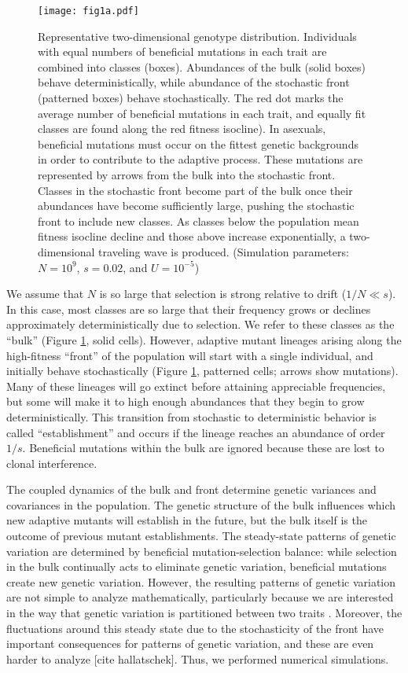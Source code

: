 \documentclass[9pt,twocolumn,twoside]{gsajnl}
\begin{document}
\begin{figure}[!ht]
\texttt{[image: fig1a.pdf]}
\caption{Representative two-dimensional genotype distribution. Individuals with equal numbers of beneficial mutations in each trait are combined into classes (boxes). Abundances of the bulk (solid boxes) behave deterministically, while abundance of the stochastic front (patterned boxes) behave stochastically. The red dot marks the average number of beneficial mutations in each trait, and equally fit classes are found along the red fitness isocline). In asexuals, beneficial mutations must occur on the fittest genetic backgrounds in order to contribute to the adaptive process. These mutations are represented by arrows from the bulk into the stochastic front. Classes in the stochastic front become part of the bulk once their abundances have become sufficiently large, pushing the stochastic front to include new classes. As classes below the population mean fitness isocline decline and those above increase exponentially, a two-dimensional traveling wave is produced. (Simulation parameters: $N=10^9$, $s=0.02$, and $U=10^{-5}$)}\label{fig:1}
\end{figure}

We assume that $N$ is so large that selection is strong relative to drift ($1/N \ll s$). In this case, most classes are so large that their frequency grows or declines approximately deterministically due to selection. We refer to these classes as the ``bulk''  (Figure \ref{fig:1}, solid cells). However, adaptive mutant lineages arising along the high-fitness ``front'' of the population will start with a single individual, and initially behave stochastically (Figure \ref{fig:1}, patterned cells; arrows show mutations). Many of these lineages will go extinct before attaining appreciable frequencies, but some will make it to high enough abundances that they begin to grow deterministically. This transition from stochastic to deterministic behavior is called ``establishment'' and occurs if the lineage reaches an abundance of order $1/s$. Beneficial mutations within the bulk are ignored because these are lost to clonal interference. \par

The coupled dynamics of the bulk and front determine genetic variances and covariances in the population. The genetic structure of the bulk influences which new adaptive mutants will establish in the future, but  the bulk itself is the outcome of previous mutant establishments. The steady-state patterns of genetic variation are determined by beneficial mutation-selection balance: while selection in the bulk continually acts to eliminate genetic variation, beneficial mutations create new genetic variation. However, the resulting patterns of genetic variation are not simple to analyze mathematically, particularly because we are interested in the way that genetic variation is  partitioned between two traits \cite{pearce2017rapid,Desai2013}. Moreover, the fluctuations around this steady state due to the stochasticity of the front have important consequences for patterns of genetic variation, and these are even harder to analyze \cite{fisher2013asexual} [cite hallatschek]. Thus, we performed numerical simulations. 
\end{document}
